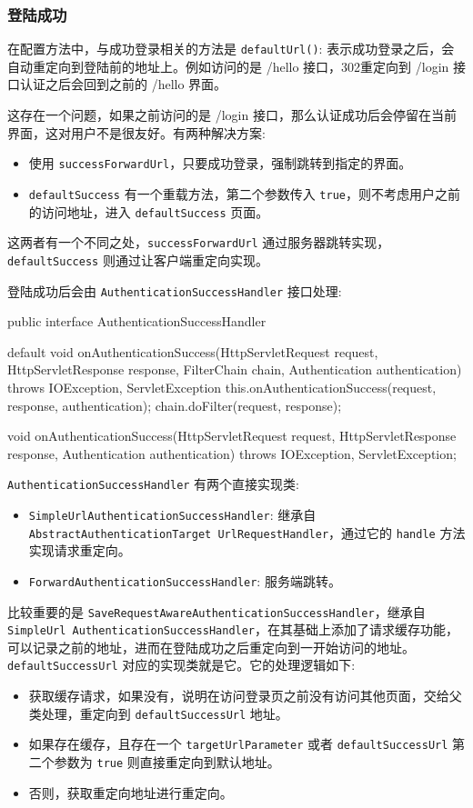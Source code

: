 \subsubsection{登陆成功}

在配置方法中，与成功登录相关的方法是 \texttt{defaultUrl()}: 表示成功登录之后，会自动重定向到登陆前的地址上。例如访问的是 /hello 接口，302重定向到 /login 接口认证之后会回到之前的 /hello 界面。

这存在一个问题，如果之前访问的是 /login 接口，那么认证成功后会停留在当前界面，这对用户不是很友好。有两种解决方案:

\begin{itemize}
  \item 使用 \texttt{successForwardUrl}，只要成功登录，强制跳转到指定的界面。
  \item \texttt{defaultSuccess} 有一个重载方法，第二个参数传入 \texttt{true}，则不考虑用户之前的访问地址，进入 \texttt{defaultSuccess} 页面。
\end{itemize}

这两者有一个不同之处，\texttt{successForwardUrl} 通过服务器跳转实现，\texttt{defaultSuccess} 则通过让客户端重定向实现。

登陆成功后会由 \texttt{AuthenticationSuccessHandler} 接口处理:
\begin{Java}
public interface AuthenticationSuccessHandler {
    default void onAuthenticationSuccess(HttpServletRequest request, HttpServletResponse response, FilterChain chain, Authentication authentication) throws IOException, ServletException {
        this.onAuthenticationSuccess(request, response, authentication);
        chain.doFilter(request, response);
    }

    void onAuthenticationSuccess(HttpServletRequest request, HttpServletResponse response, Authentication authentication) throws IOException, ServletException;
}
\end{Java}

\texttt{AuthenticationSuccessHandler} 有两个直接实现类:
\begin{itemize}
  \item \texttt{SimpleUrlAuthenticationSuccessHandler}: 继承自 \texttt{AbstractAuthenticationTarget UrlRequestHandler}，通过它的 \texttt{handle} 方法实现请求重定向。
  \item \texttt{ForwardAuthenticationSuccessHandler}: 服务端跳转。
\end{itemize}

比较重要的是 \texttt{SaveRequestAwareAuthenticationSuccessHandler}，继承自 \texttt{SimpleUrl AuthenticationSuccessHandler}，在其基础上添加了请求缓存功能，可以记录之前的地址，进而在登陆成功之后重定向到一开始访问的地址。\texttt{defaultSuccessUrl} 对应的实现类就是它。它的处理逻辑如下:
\begin{itemize}
  \item 获取缓存请求，如果没有，说明在访问登录页之前没有访问其他页面，交给父类处理，重定向到 \texttt{defaultSuccessUrl} 地址。
  \item 如果存在缓存，且存在一个 \texttt{targetUrlParameter} 或者 \texttt{defaultSuccessUrl} 第二个参数为 \texttt{true} 则直接重定向到默认地址。
  \item 否则，获取重定向地址进行重定向。
\end{itemize}


